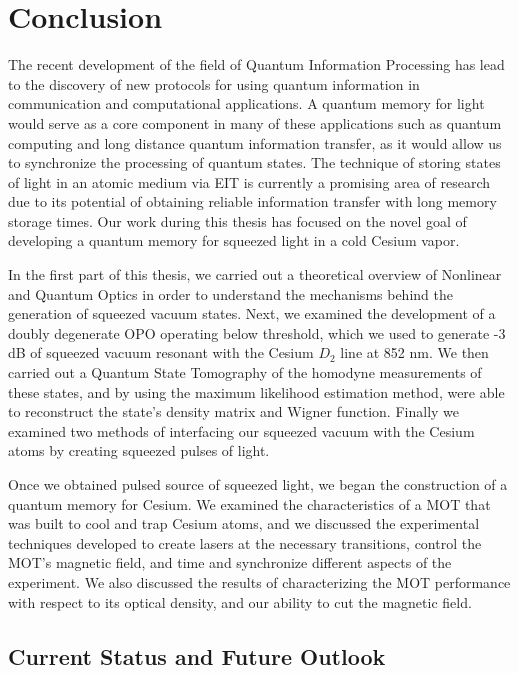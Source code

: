\chapter*{Conclusion}
\label{conclusion} 

The recent development of the field of Quantum Information Processing has lead to the discovery of new protocols for using quantum information in communication and computational applications.  A quantum memory for light would serve as a core component in many of these applications such as quantum computing and long distance quantum information transfer, as it would allow us to synchronize the processing of quantum states.  The technique of storing states of light in an atomic medium via EIT is currently a promising area of research due to its potential of obtaining reliable information transfer with long memory storage times.  Our work during this thesis has focused on the novel goal of developing a quantum memory for squeezed light in a cold Cesium vapor.

In the first part of this thesis, we carried out a theoretical  overview of Nonlinear and Quantum Optics in order to understand the mechanisms behind the generation of squeezed vacuum states.  Next, we examined the development of a doubly degenerate OPO operating below threshold, which we used to generate -3 dB of squeezed vacuum resonant with the Cesium $D_2$ line at 852 nm.  We then carried out a Quantum State Tomography of the homodyne measurements of these states, and by using the maximum likelihood estimation method, were able to reconstruct the state's density matrix and Wigner function.  Finally we examined two methods of interfacing our squeezed vacuum with the Cesium atoms by creating squeezed pulses of light.

Once we obtained pulsed source of squeezed light, we began the construction of a quantum memory for Cesium.  We examined the characteristics of a MOT that was built to cool and trap Cesium atoms, and we discussed the experimental techniques developed to create lasers at the necessary transitions, control the MOT's magnetic field, and time and synchronize different aspects of the experiment.  We also discussed the results of characterizing the MOT performance with respect to its optical density, and our ability to cut the magnetic field.  

\section*{Current Status and Future Outlook}

